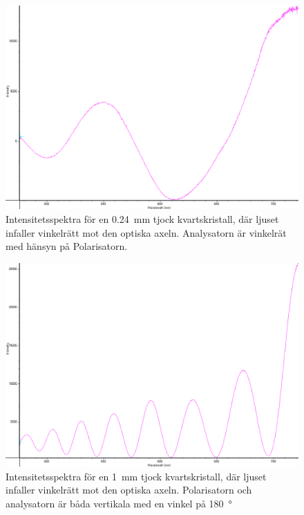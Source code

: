 \documentclass[a4paper]{article}
\begin{document}
\FloatBarrier
\begin{figure}[h!]
	\centering
	\includegraphics[width=\linewidth]{data/spektra_180_kristall1_270_inv}
	\caption{Intensitetsspektra för en \SI{0.24}{\milli\m} tjock kvartskristall, där ljuset infaller vinkelrätt mot den optiska axeln. Analysatorn är vinkelrät med hänsyn på Polarisatorn.}
	\label{fig:}
\end{figure}
\FloatBarrier

\FloatBarrier
\begin{figure}[h!]
	\centering
	\includegraphics[width=\linewidth]{data/spektra_180_kristall2_0_inv}
	\caption{Intensitetsspektra för en \SI{1}{\milli\m} tjock kvartskristall, där ljuset infaller vinkelrätt mot den optiska axeln.  Polarisatorn och analysatorn är båda vertikala med en vinkel på \SI{180}{\degree}}
	\label{fig:}
\end{figure}
\FloatBarrier	
\end{document}
